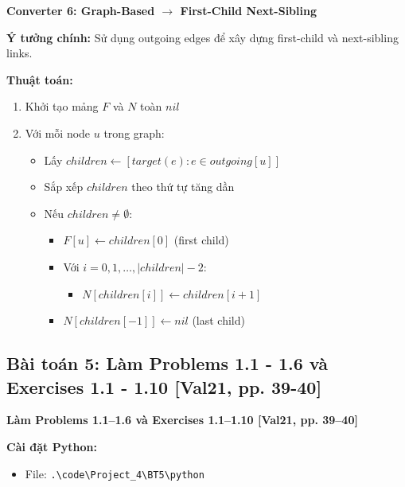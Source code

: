 \documentclass[12pt,a4paper]{article}
\begin{document}
\newpage

\textbf{Converter 6: Graph-Based $\rightarrow$ First-Child Next-Sibling}
\vspace{0.5cm}

\textbf{Ý tưởng chính:} Sử dụng outgoing edges để xây dựng first-child và next-sibling links.

\textbf{Thuật toán:}
\begin{enumerate}
    \item Khởi tạo mảng $F$ và $N$ toàn $nil$
    \item Với mỗi node $u$ trong graph:
    \begin{itemize}
        \item Lấy $children \leftarrow [target(e) : e \in outgoing[u]]$
        \item Sắp xếp $children$ theo thứ tự tăng dần
        \item Nếu $children \neq \emptyset$:
        \begin{itemize}
            \item $F[u] \leftarrow children[0]$ (first child)
            \item Với $i = 0, 1, \ldots, |children| - 2$:
            \begin{itemize}
                \item $N[children[i]] \leftarrow children[i+1]$
            \end{itemize}
            \item $N[children[-1]] \leftarrow nil$ (last child)
        \end{itemize}
    \end{itemize}
\end{enumerate}

\vspace{0.5cm}






\newpage

\subsection{Bài toán 5: Làm Problems 1.1 - 1.6 và Exercises 1.1 - 1.10 [Val21, pp. 39-40]}

\begin{problembox}
    \textbf{Làm Problems 1.1–1.6 và Exercises 1.1–1.10 [Val21, pp. 39–40]} 

\end{problembox}

\textbf{Cài đặt Python:}
\begin{itemize}[label=\textbullet]
    \item File: \texttt{.\textbackslash code\textbackslash Project\_4\textbackslash BT5\textbackslash python}
\end{itemize}
\end{document}

